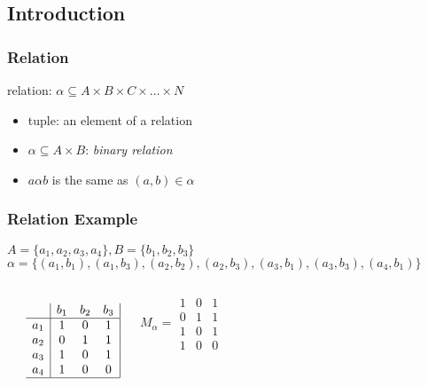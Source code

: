 \documentclass[dvipsnames]{beamer}
\begin{document}
\subsection{Introduction}

\begin{frame}
  \frametitle{Relation}

  \begin{definition}
    \alert{relation}: $\alpha \subseteq A \times B \times C \times \dots \times N$
  \end{definition}

  \begin{itemize}
    \item \alert{tuple}: an element of a relation
  \end{itemize}

  \pause
  \medskip
  \begin{itemize}
    \item $\alpha \subseteq A \times B$: \emph{binary relation}
    \item $a \alpha b$ is the same as $(a,b) \in \alpha$
  \end{itemize}
\end{frame}

\begin{frame}
  \frametitle{Relation Example}

  \begin{example}
    $A=\{a_1,a_2,a_3,a_4\}, B=\{b_1,b_2,b_3\}$\\
    $\alpha = \{(a_1,b_1),(a_1,b_3),(a_2,b_2),(a_2,b_3),
                (a_3,b_1),(a_3,b_3),(a_4,b_1)\}$

    \pause
    \medskip
    \begin{columns}
      \begin{center}
      \end{center}

      \[
        \begin{array}{c|ccc|}
              & b_1 & b_2 & b_3\\\hline
          a_1 &  1  &  0  &  1\\
          a_2 &  0  &  1  &  1\\
          a_3 &  1  &  0  &  1\\
          a_4 &  1  &  0  &  0\\\hline
        \end{array}
      \]

      \[
        M_\alpha =
          \begin{array}{|ccc|}
            1 & 0 & 1\\
            0 & 1 & 1\\
            1 & 0 & 1\\
            1 & 0 & 0
          \end{array}
      \]
    \end{columns}
  \end{example}
\end{frame}
\end{document}
